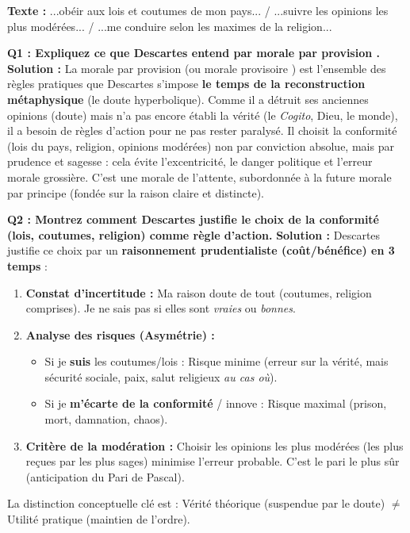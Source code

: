 \documentclass[11pt]{article}
\newcommand{\cle}[1]{{\popxbold\color{popdark}#1}}
\begin{document}
\begin{exoresolu}
\textbf{Texte :} \og ...obéir aux lois et coutumes de mon pays... / ...suivre les opinions les plus modérées... / ...me conduire selon les maximes de la religion... \fg

\tcblower
\textbf{Q1 : Expliquez ce que Descartes entend par \og morale par provision \fg.}
\textbf{Solution :}
\og La \cle{morale par provision} (ou \og morale provisoire \fg) est l'ensemble des règles pratiques que Descartes s'impose \textbf{le temps de la reconstruction métaphysique} (le doute hyperbolique). Comme il a détruit ses anciennes opinions (doute) mais n'a pas encore établi la vérité (le \emph{Cogito}, Dieu, le monde), il a besoin de \cle{règles d'action} pour ne pas rester paralysé. Il choisit la \cle{conformité} (lois du pays, religion, opinions modérées) non par conviction absolue, mais par \cle{prudence} et \cle{sagesse} : cela évite l'excentricité, le danger politique et l'erreur morale grossière. C'est une \cle{morale de l'attente}, subordonnée à la future \cle{morale par principe} (fondée sur la raison claire et distincte). \fg

\textbf{Q2 : Montrez comment Descartes justifie le choix de la \og conformité \fg (lois, coutumes, religion) comme règle d'action.}
\textbf{Solution :}
\og Descartes justifie ce choix par un \textbf{raisonnement prudentialiste (coût/bénéfice) en 3 temps} :
\begin{enumerate}
    \item \textbf{Constat d'incertitude :} Ma raison doute de tout (coutumes, religion comprises). Je ne sais pas si elles sont \emph{vraies} ou \emph{bonnes}.
    \item \textbf{Analyse des risques (Asymétrie) :}
    \begin{itemize}
        \item Si je \textbf{suis} les coutumes/lois : Risque minime (erreur sur la vérité, mais sécurité sociale, paix, salut religieux \emph{au cas où}).
        \item Si je \textbf{m'écarte de la conformité} / innove : Risque maximal (prison, mort, damnation, chaos).
    \end{itemize}
    \item \textbf{Critère de la \cle{modération} :} Choisir les opinions \og les plus modérées \fg (les plus reçues par les plus sages) minimise l'erreur probable. C'est le \og pari le plus sûr \fg (anticipation du \og Pari \fg de Pascal).
\end{enumerate}
La \cle{distinction conceptuelle} clé est : \og Vérité théorique \fg (suspendue par le doute) $\neq$ \og Utilité pratique \fg (maintien de l'ordre). \fg


\end{exoresolu}
\end{document}
